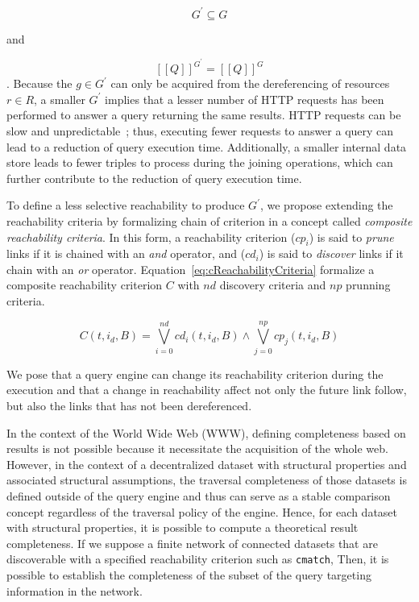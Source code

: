 \begin{equation}\label{eq:subsetDKG}
G^{\prime} \subseteq G
\end{equation}

and 

\begin{equation}\label{eq:evalQueryStructuralAssumption}
   [\![ Q ]\!]^{G^{\prime}} = [\![ Q ]\!]^{G}
\end{equation}
.
Because the $g \in G^{\prime}$ can only be acquired from the dereferencing of resources $r \in R$, a smaller $G^\prime$ implies that a lesser number of HTTP requests has been performed to answer a query
returning the same results.
HTTP requests can be slow and unpredictable~\cite{hartig2016walking}; thus, executing fewer requests to answer a query can lead to a reduction of query execution time.
Additionally, a smaller internal data store leads to fewer triples to process during the joining operations, which can further contribute to the reduction of query execution time.

To define a less selective reachability to produce $G^{\prime}$, we propose extending the reachability criteria by formalizing chain of criterion in a concept called \emph{composite reachability criteria}.
In this form, a reachability criterion ($cp_i$) is said to \emph{prune} links if it is chained with an \emph{and} operator, and ($cd_i$) is said to \emph{discover} links if it chain with an \emph{or} operator.
Equation~\ref{eq:cReachabilityCriteria} formalize a composite reachability criterion $C$ with $nd$ discovery criteria and $np$ prunning criteria.

\begin{equation}\label{eq:cReachabilityCriteria}
    C(t, i_d, B)  = \bigvee_{i=0}^{nd}cd_i(t, i_d, B) \land \bigvee_{j=0}^{np}cp_j(t, i_d, B)
\end{equation}

We pose that a query engine can change its reachability criterion during the execution and that a change in  reachability affect not only the future link follow,
but also the links that has not been dereferenced.
\iffalse
Maybe refer to the link queue here in a footnote.
\fi

\iffalse
In the context of the World Wide Web (WWW), defining completeness based on results is not possible because it necessitate the acquisition of the whole web.
However, in the context of a decentralized dataset with structural properties and associated structural assumptions,
the traversal completeness of those datasets is defined outside of the query engine and thus can serve as a 
stable comparison concept regardless of the traversal policy of the engine.
Hence, for each dataset with structural properties, it is possible to compute a theoretical result completeness.
If we suppose a finite network of connected datasets that are discoverable with a specified reachability criterion such as \texttt{cmatch},
Then, it is possible to establish the completeness of the subset of the query targeting information in the network.



